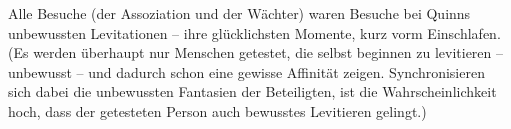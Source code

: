 Alle Besuche (der Assoziation und der Wächter) waren Besuche bei Quinns
unbewussten Levitationen -- ihre glücklichsten Momente, kurz vorm Einschlafen. 
(Es werden überhaupt nur Menschen getestet, die selbst beginnen zu levitieren --
unbewusst -- und dadurch schon eine gewisse Affinität zeigen. 
Synchronisieren sich dabei die unbewussten Fantasien der Beteiligten, ist die
Wahrscheinlichkeit hoch, dass der getesteten Person auch bewusstes Levitieren
gelingt.)
